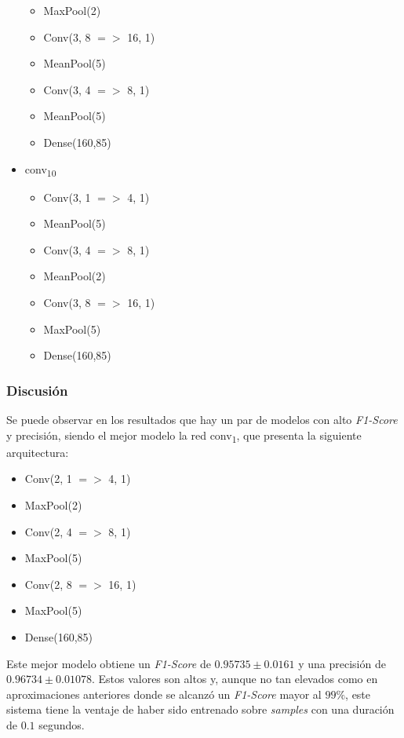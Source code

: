 \documentclass[12pt]{article}
\begin{document}
\begin{itemize}
\begin{itemize}
  		\item MaxPool(2)
		\item Conv(3, 8 $=>$ 16, 1)
    	\item MeanPool(5)
		\item Conv(3, 4 $=>$ 8, 1)
		\item MeanPool(5)
  		\item Dense(160,85)
	\end{itemize}
	\item conv\textsubscript{10} \begin{itemize}
		\item Conv(3, 1 $=>$ 4, 1)
  		\item MeanPool(5)
		\item Conv(3, 4 $=>$ 8, 1)
    	\item MeanPool(2)
		\item Conv(3, 8 $=>$ 16, 1)
		\item MaxPool(5)
  		\item Dense(160,85)
	\end{itemize}
\end{itemize}

\subsubsection{Discusión}

Se puede observar en los resultados que hay un par de modelos con alto \textit{F1-Score} y precisión,
siendo el mejor modelo la red conv\textsubscript{1}, que presenta la siguiente arquitectura:

\begin{itemize}
	\item Conv(2, 1 $=>$ 4, 1)
	\item MaxPool(2)
	\item Conv(2, 4 $=>$ 8, 1)
	\item MaxPool(5)
	\item Conv(2, 8 $=>$ 16, 1)
	\item MaxPool(5)
	\item Dense(160,85)
\end{itemize}

Este mejor modelo obtiene un \textit{F1-Score} de $0.95735 \pm 0.0161$ y una
precisión de  $0.96734 \pm 0.01078$. Estos valores son altos y, aunque no tan elevados como en aproximaciones
anteriores donde se alcanzó un \textit{F1-Score} mayor al $99\%$, este sistema tiene la ventaje de haber sido entrenado sobre 
\textit{samples} con una duración de $0.1$ segundos.
\end{document}
